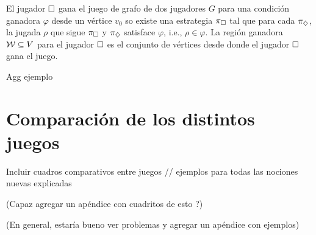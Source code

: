 \begin{definition}
	El jugador $\square$ gana el juego de grafo de dos jugadores $G$ para una condición ganadora $\varphi$ desde un vértice $v_0$ so existe una estrategia $\pi_\square$ tal que para cada $\pi_\diamondsuit$, la jugada $\rho$ que sigue $\pi_\square$ y $\pi_\diamondsuit$ satisface $\varphi$, i.e., $\rho \in \varphi$.
	La región ganadora $\mathcal{W} \subseteq V$ para el jugador $\square$ es el conjunto de vértices desde donde el jugador $\square$ gana el juego.
\end{definition}

Agg ejemplo

\section{Comparación de los distintos juegos}

Incluir cuadros comparativos entre juegos // ejemplos para todas las nociones
nuevas explicadas

(Capaz agregar un apéndice con cuadritos de esto ?)

(En general, estaría bueno ver problemas y agregar un apéndice con ejemplos)